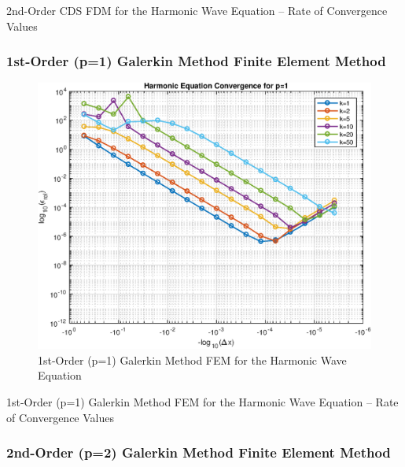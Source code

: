 \documentclass[10pt]{article}		%
\numberwithin{equation}{section}
\begin{document}
\begin{table}[H]
	
	\caption{2nd-Order CDS FDM for the Harmonic Wave Equation -- Rate of Convergence Values}	
\end{table}

\newpage

\subsubsection{1st-Order (p=1) Galerkin Method Finite Element Method}

\begin{figure}[H]
	\begin{center}
		\includegraphics[width = 0.5\linewidth]{convergence_harmonic_p_1}
		\caption{ 1st-Order (p=1) Galerkin Method FEM for the Harmonic Wave Equation}	
	\end{center}
\end{figure}

\begin{table}[H]
	
	\caption{ 1st-Order (p=1) Galerkin Method FEM for the Harmonic Wave Equation -- Rate of Convergence Values}	
\end{table}

\newpage

\subsubsection{2nd-Order (p=2) Galerkin Method Finite Element Method}

%
%	
\end{document}
